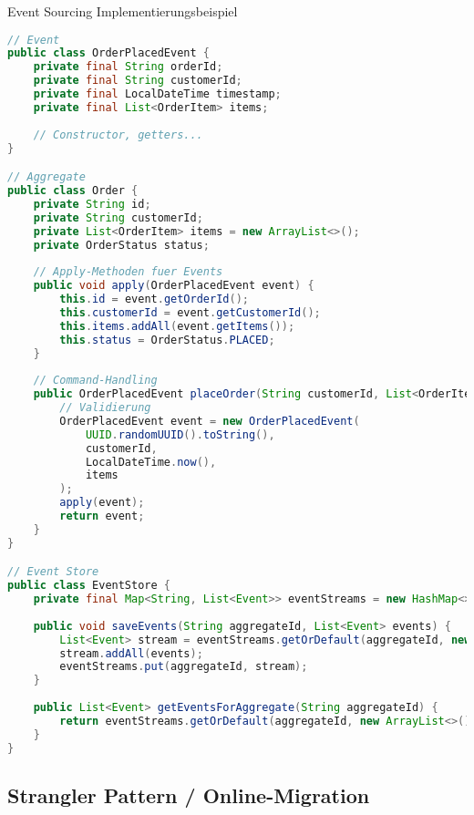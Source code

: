 \begin{examplecode}{Event Sourcing Implementierungsbeispiel}\\
\begin{lstlisting}[language=Java, style=basesmol]
// Event
public class OrderPlacedEvent {
    private final String orderId;
    private final String customerId;
    private final LocalDateTime timestamp;
    private final List<OrderItem> items;
    
    // Constructor, getters...
}

// Aggregate
public class Order {
    private String id;
    private String customerId;
    private List<OrderItem> items = new ArrayList<>();
    private OrderStatus status;
    
    // Apply-Methoden fuer Events
    public void apply(OrderPlacedEvent event) {
        this.id = event.getOrderId();
        this.customerId = event.getCustomerId();
        this.items.addAll(event.getItems());
        this.status = OrderStatus.PLACED;
    }
    
    // Command-Handling
    public OrderPlacedEvent placeOrder(String customerId, List<OrderItem> items) {
        // Validierung
        OrderPlacedEvent event = new OrderPlacedEvent(
            UUID.randomUUID().toString(), 
            customerId, 
            LocalDateTime.now(), 
            items
        );
        apply(event);
        return event;
    }
}

// Event Store
public class EventStore {
    private final Map<String, List<Event>> eventStreams = new HashMap<>();
    
    public void saveEvents(String aggregateId, List<Event> events) {
        List<Event> stream = eventStreams.getOrDefault(aggregateId, new ArrayList<>());
        stream.addAll(events);
        eventStreams.put(aggregateId, stream);
    }
    
    public List<Event> getEventsForAggregate(String aggregateId) {
        return eventStreams.getOrDefault(aggregateId, new ArrayList<>());
    }
}
\end{lstlisting}
\end{examplecode}

\subsection{Strangler Pattern / Online-Migration}

